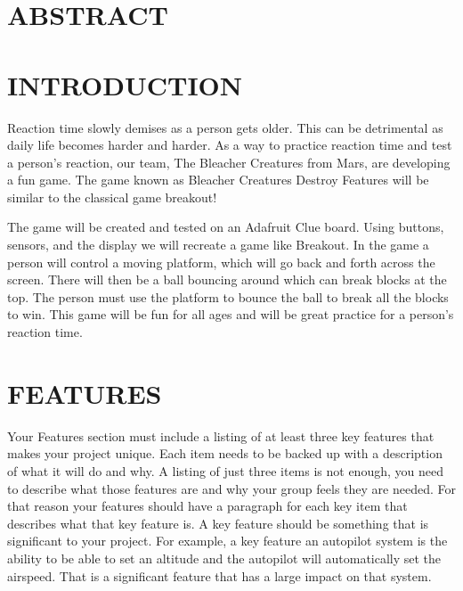 \documentclass[12pt]{article}
\begin{document}
\tableofcontents
\pagebreak

\section{ABSTRACT}



\section{INTRODUCTION}
Reaction time slowly demises as a person gets older. This can be detrimental as daily life becomes harder and harder. As a way to practice reaction time and test a person's reaction, our team, The Bleacher Creatures from Mars, are developing a fun game. The game known as Bleacher Creatures Destroy Features will be similar to the classical game breakout!

The game will be created and tested on an Adafruit Clue board. Using buttons, sensors, and the display we will recreate a game like Breakout. In the game a person will control a moving platform, which will go back and forth across the screen. There will then be a ball bouncing around which can break blocks at the top. The person must use the platform to bounce the ball to break all the blocks to win. This game will be fun for all ages and will be great practice for a person's reaction time.


\section{FEATURES}
Your Features section must include a listing of at least three key features that makes your project unique. Each item needs to be backed up with a description of what it will do and why. A listing of just three items is not enough, you need to describe what those features are and why your group feels they are needed. For that reason your features should have a paragraph for each key item that describes what that key feature is. A key feature should be something that is significant to your project. For example, a key feature an autopilot system is the ability to be able to set an altitude and the autopilot will automatically set the airspeed. That is a significant feature that has a large impact on that system.
\end{document}
